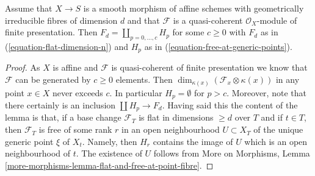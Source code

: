 \begin{lemma}
\label{lemma-compare-H-F}
Assume that $X \to S$ is a smooth morphism of affine schemes
with geometrically irreducible fibres of dimension $d$ and that
$\mathcal{F}$ is a quasi-coherent $\mathcal{O}_X$-module of finite
presentation. Then $F_d = \coprod_{p = 0, \ldots, c} H_p$
for some $c \geq 0$ with $F_d$ as in
(\ref{equation-flat-dimension-n}) and $H_p$ as in
(\ref{equation-free-at-generic-points}).
\end{lemma}

\begin{proof}
As $X$ is affine and $\mathcal{F}$ is quasi-coherent of finite presentation
we know that $\mathcal{F}$ can be generated by $c \geq 0$ elements.
Then $\dim_{\kappa(x)}(\mathcal{F}_x \otimes \kappa(x))$
in any point $x \in X$ never exceeds $c$. In particular $H_p = \emptyset$
for $p > c$. Moreover, note that there certainly is an inclusion
$\coprod H_p \to F_d$. Having said this the content
of the lemma is that, if a base change $\mathcal{F}_T$ is flat in
dimensions $\geq d$ over $T$ and if $t \in T$, then $\mathcal{F}_T$ is
free of some rank $r$ in an open neighbourhood $U \subset X_T$
of the unique generic point $\xi$ of $X_t$. Namely, then $H_r$
contains the image of $U$ which is an open neighbourhood of $t$.
The existence of $U$ follows from
More on Morphisms, Lemma
\ref{more-morphisms-lemma-flat-and-free-at-point-fibre}.
\end{proof}
